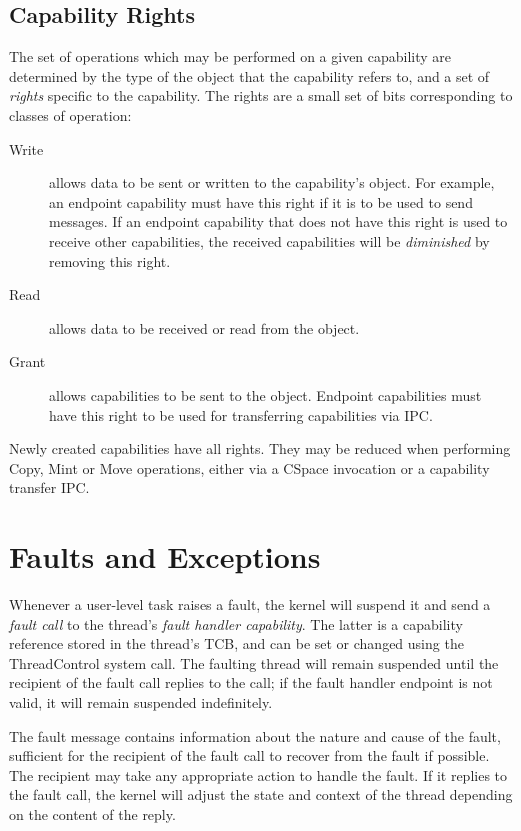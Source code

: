 \subsection{Capability Rights}\label{sec:overview.cspace.rights}

The set of operations which may be performed on a given capability are
determined by the type of the object that the capability refers to, and a set
of \emph{rights} specific to the capability. The rights are a small set of bits corresponding to classes of operation:

\begin{description}
\item[Write] allows data to be sent or written to the capability's object. For
example, an endpoint capability must have this right if it is to be used to
send messages. If an endpoint capability that does not have this right is used to receive other capabilities, the received capabilities will be \emph{diminished} by removing this right.

\item[Read] allows data to be received or read from the object.

\item[Grant] allows capabilities to be sent to the object. Endpoint capabilities must have this right to be used for transferring capabilities via IPC.
\end{description}

Newly created capabilities have all rights. They may be reduced when performing
Copy, Mint or Move operations, either via a CSpace invocation or a capability
transfer IPC.

\section{Faults and Exceptions}\label{sec:overview.faults}

Whenever a user-level task raises a fault, the kernel will suspend
it and send a \emph{fault call} to the thread's \emph{fault handler
capability}. The latter is a capability reference stored in the thread's TCB,
and can be set or changed using the ThreadControl system call. The faulting thread will remain suspended until the recipient of the fault call replies to the call; if the fault handler endpoint is not valid, it will remain suspended indefinitely.

The fault message contains information about the nature and cause of the
fault, sufficient for the recipient of the fault call to recover from the
fault if possible. The recipient may take any appropriate action to handle the fault. If it replies to the fault call, the kernel will adjust the state and context of the thread depending on the content of the reply.

